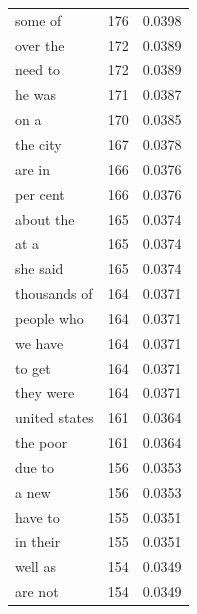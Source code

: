 \begin{tabular}{lrl}
some of & 176 & 0.0398 \\
over the & 172 & 0.0389 \\
need to & 172 & 0.0389 \\
he was & 171 & 0.0387 \\
on a & 170 & 0.0385 \\
the city & 167 & 0.0378 \\
are in & 166 & 0.0376 \\
per cent & 166 & 0.0376 \\
about the & 165 & 0.0374 \\
at a & 165 & 0.0374 \\
she said & 165 & 0.0374 \\
thousands of & 164 & 0.0371 \\
people who & 164 & 0.0371 \\
we have & 164 & 0.0371 \\
to get & 164 & 0.0371 \\
they were & 164 & 0.0371 \\
united states & 161 & 0.0364 \\
the poor & 161 & 0.0364 \\
due to & 156 & 0.0353 \\
a new & 156 & 0.0353 \\
have to & 155 & 0.0351 \\
in their & 155 & 0.0351 \\
well as & 154 & 0.0349 \\
are not & 154 & 0.0349 \\
\bottomrule
\end{tabular}
